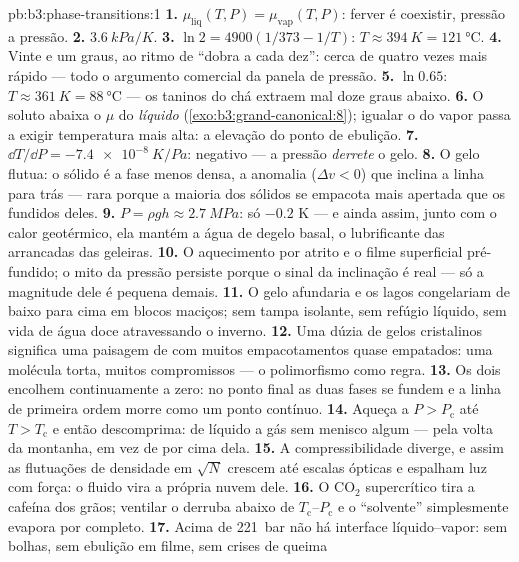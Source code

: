 \begin{solution}{pb:b3:phase-transitions:1}
\textbf{1.} $\mu_{\text{liq}}(T, P) = \mu_{\text{vap}}(T,
P)$: ferver é coexistir, pressão a pressão.
\textbf{2.} $\qty{3.6}{kPa/K}$.
\textbf{3.} $\ln2 = 4900(1/373 - 1/T)$: $T \approx \qty{394}{K} =
\qty{121}{\celsius}$.
\textbf{4.} Vinte e um graus, ao ritmo de ``dobra a cada dez'': cerca
de quatro vezes mais rápido --- todo o argumento comercial da panela de pressão.
\textbf{5.} $\ln0.65$: $T \approx \qty{361}{K} =
\qty{88}{\celsius}$ --- os taninos do chá extraem mal doze graus
abaixo.
\textbf{6.} O soluto abaixa o $\mu$ do \emph{líquido}
(\cref{exo:b3:grand-canonical:8}); igualar o do vapor passa a exigir
temperatura mais alta: a elevação do ponto de ebulição.
\textbf{7.} $\dd T/\dd P = \qty{-7.4e-8}{K/Pa}$: negativo ---
a pressão \emph{derrete} o gelo.
\textbf{8.} O gelo flutua: o sólido é a fase menos densa, a
anomalia ($\Delta v < 0$) que inclina a linha para trás --- rara
porque a maioria dos sólidos se empacota mais apertada que os fundidos deles.
\textbf{9.} $P = \rho gh \approx \qty{2.7}{MPa}$: só
$-0.2$ K --- e ainda assim, junto com o calor geotérmico, ela mantém a
água de degelo basal, o lubrificante das arrancadas das geleiras.
\textbf{10.} O aquecimento por atrito e o filme superficial pré-fundido;
o mito da pressão persiste porque o sinal da inclinação é real
--- só a magnitude dele é pequena demais.
\textbf{11.} O gelo afundaria e os lagos congelariam de baixo para cima
em blocos maciços; sem tampa isolante, sem refúgio líquido, sem vida
de água doce atravessando o inverno.
\textbf{12.} Uma dúzia de gelos cristalinos significa uma paisagem de
 com muitos empacotamentos quase empatados: uma molécula
torta, muitos compromissos --- o polimorfismo como regra.
\textbf{13.} Os dois encolhem continuamente a zero: no ponto final
as duas fases se fundem e a linha de primeira ordem morre como um
ponto contínuo.
\textbf{14.} Aqueça a $P > P_{\text{c}}$ até $T > T_{\text{c}}$
e então descomprima: de líquido a gás sem menisco algum --- pela volta
da montanha, em vez de por cima dela.
\textbf{15.} A compressibilidade diverge, e assim as flutuações de
densidade em $\sqrt N$ crescem até escalas ópticas e espalham luz com
força: o fluido vira a própria nuvem dele.
\textbf{16.} O CO$_2$ supercrítico tira a cafeína dos grãos;
ventilar o derruba abaixo de $T_{\text{c}}$--$P_{\text{c}}$ e o
``solvente'' simplesmente evapora por completo.
\textbf{17.} Acima de \qty{221}{bar} não há interface
líquido--vapor: sem bolhas, sem ebulição em filme, sem crises de queima

\end{solution}
